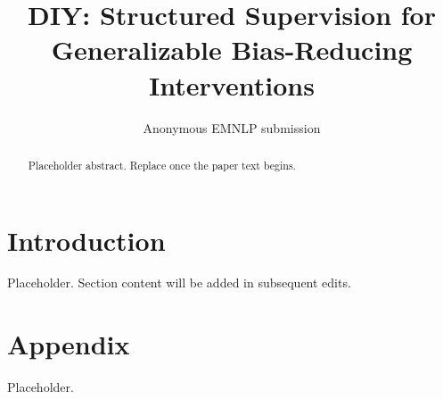 \documentclass[11pt]{article}
\title{DIY: Structured Supervision for Generalizable Bias-Reducing Interventions}
\author{
  Anonymous EMNLP submission
}
\begin{document}
\maketitle

\begin{abstract}
Placeholder abstract. Replace once the paper text begins.
\end{abstract}

\section{Introduction}
Placeholder. Section content will be added in subsequent edits.

% 

\appendix

\section{Appendix}
Placeholder.
\end{document}
